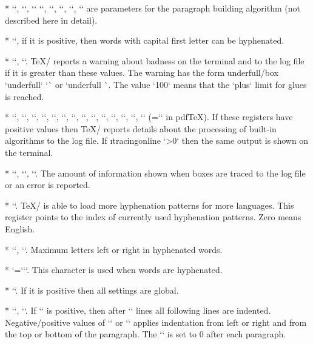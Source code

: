 {* \y``,
  \y``, \y`\emergencystretch=0pt`
  \y``,
  \y``,
  \y``,
  \y`\hfuzz=0.1pt`,
  \y`\vfuzz=0.1pt`
are parameters for the paragraph building algorithm (not described here in
detail).

* \y``, if it is positive, then words with capital first letter can
  be hyphenated. 

* \y``,
  \y``. \TeX/ reports a warning about \iid badness on the terminal
  and to the log file if it is greater than these values. The warning has the form
  \ii underfull/box `underfull` `\hbox` or `underfull \vbox`. The value `100`
  means that the `plus` limit for glues is reached.

* \y``,
  \y``,
  \y``,
  \y``,
  \y``,
  \y``,
  \y``,
  \y``,
  \y``,
  \y``, 
  \y``,
  \y``, 
  \y``,
  \y`` (=`\pdftracingfonts` in pdf\TeX).
  If these registers have positive values then \TeX/ reports details about
  the processing of built-in
  algorithms to the log file. If \i tracingonline `\tracingonline>0` then the same
  output is shown on the terminal.

* \y``,
  \y``,
  \y``.
  The amount of information shown when boxes are traced to the log file or an error is
  reported.

* \y``. 
  \TeX/ is able to load more hyphenation patterns for more
  languages. This register points to the index of currently used
  hyphenation patterns. Zero means English.

* \y``, \y``. Maximum letters left or right in
  hyphenated words.

* \y`=``\-`. This character is used when words are
  hyphenated.

* \y``. If it is positive then all settings are global.

* \y``,
  \y`\hangindent=0pt`.
  If \x`\hangindent` is positive, then after \x`\hangafter` lines all following
  lines are indented. Negative/positive values of \x`\hangindent` or \x`\hangafter` applies
  indentation from left or right and from the top or bottom of the paragraph.
  The \x`\hangindent` is set to 0 after each paragraph.

}
